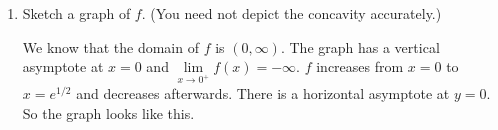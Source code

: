 \documentclass{article}
\begin{document}
\begin{enumerate}[resume]
\begin{enumerate}
\begin{solution}
    \end{solution}

  \item
    \begin{problem}[\stretch{0.6}]
      Sketch a graph of $f$. (You need not depict the concavity accurately.) 
    \end{problem}

    \begin{solution}
      We know that the domain of $f$ is $(0, \infty)$. The graph has a vertical asymptote at $x=0$ and
      $\lim\limits_{x\to 0^+} f(x) = -\infty$. $f$ increases
      from $x=0$ to $x=e^{1/2}$ and decreases afterwards. There
      is a horizontal asymptote at $y=0$. So the graph looks
      like this.

      \begin{center}
      \end{center}
    \end{solution}

  \end{enumerate}

\end{enumerate}
\end{document}
